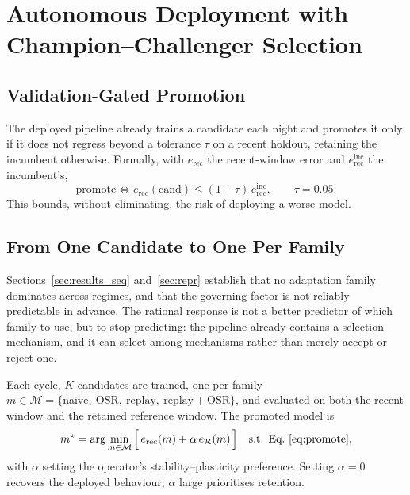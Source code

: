 \documentclass[journal]{IEEEtran}
\begin{document}
\section{Autonomous Deployment with Champion--Challenger Selection}
\label{sec:selection}

\subsection{Validation-Gated Promotion}
The deployed pipeline already trains a candidate each night and promotes it only
if it does not regress beyond a tolerance $\tau$ on a recent holdout, retaining
the incumbent otherwise. Formally, with $e_{\mathrm{rec}}$ the recent-window
error and $e^{\mathrm{inc}}_{\mathrm{rec}}$ the incumbent's,
\begin{equation}
\text{promote} \iff e_{\mathrm{rec}}(\text{cand}) \le (1+\tau)\,
e^{\mathrm{inc}}_{\mathrm{rec}} , \qquad \tau = 0.05 .
\label{eq:promote}
\end{equation}
This bounds, without eliminating, the risk of deploying a worse model.

\subsection{From One Candidate to One Per Family}
Sections~\ref{sec:results_seq} and~\ref{sec:repr} establish that no adaptation
family dominates across regimes, and that the governing factor is not reliably
predictable in advance. The rational response is not a better predictor of which
family to use, but to stop predicting: the pipeline already contains a selection
mechanism, and it can select among mechanisms rather than merely accept or
reject one.

Each cycle, $K$ candidates are trained, one per family
$m \in \mathcal{M} = \{\text{naive},\ \text{OSR},\ \text{replay},\
\text{replay}{+}\text{OSR}\}$, and evaluated on both the recent window and the
retained reference window. The promoted model is
\begin{equation}
m^{\star} = \arg\min_{m \in \mathcal{M}}
\Big[\, e_{\mathrm{rec}}(m) + \alpha\, e_{\mathcal{R}}(m) \,\Big]
\quad \text{s.t. Eq.~\eqref{eq:promote}} ,
\label{eq:selection}
\end{equation}
with $\alpha$ setting the operator's stability--plasticity preference. Setting
$\alpha{=}0$ recovers the deployed behaviour; $\alpha$ large prioritises
retention.
\end{document}
